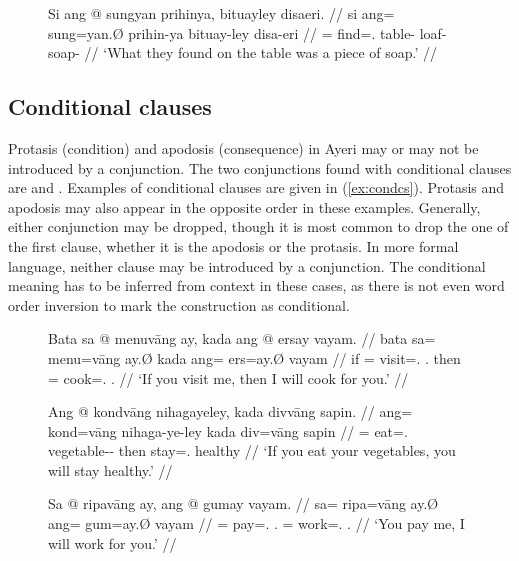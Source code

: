 \begin{figure}[h]
\ex\label{ex:relcheadless}%
\ljudge\ques\begingl
	\gla Si ang @ sungyan prihinya, bituayley disaeri. //
	\glb si ang= sung=yan.Ø prihin-ya bituay-ley disa-eri //
	\glc \Rel{} \AgtT{}= find=\TplM{}.\Top{} table-\Loc{} loaf-\PargI{}
		soap-\Ins{} //
	\glft `What they found on the table was a piece of soap.' //
\endgl
\xe
\end{figure}

\subsection{Conditional clauses}
\label{subsec:condcs}

Protasis (condition) and apodosis (consequence) in Ayeri may or may not be
introduced by a conjunction. The two conjunctions found with conditional
clauses are  and .
Examples of conditional clauses are given in (\ref{ex:condcs}). Protasis and
apodosis may also appear in the opposite order in these examples. Generally,
either conjunction may be dropped, though it is most common to drop the one of
the first clause, whether it is the apodosis or the protasis. In more formal
language, neither clause may be introduced by a conjunction. The conditional
meaning has to be inferred from context in these cases, as there is not even
word order inversion to mark the construction as conditional.

\begin{figure}
\pex\label{ex:condcs}
\a\label{ex:condcs_1}\begingl
	\gla Bata sa @ menuvāng ay, kada ang @ ersay vayam. //
	\glb bata sa= menu=vāng ay.Ø kada ang= ers=ay.Ø vayam //
	\glc if \PatT{}= visit=\Second.\Aarg{} \Fsg{}.\Top{} then \AgtT{}=
		cook=\Fsg{}.\Top{} \Second.\Dat{} //
	\glft `If you visit me, then I will cook for you.' //
\endgl

\a\label{ex:condcs_2}\begingl
	\gla Ang @ kondvāng nihagayeley, kada divvāng sapin. //
	\glb ang= kond=vāng nihaga-ye-ley kada div=vāng sapin //
	\glc \AgtT{}= eat=\Second.\Aarg{} vegetable-\Pl{}-\PargI{} then
		stay=\Second{}.\Aarg{} healthy //
	\glft `If you eat your vegetables, you will stay healthy.' //
\endgl

\a\label{ex:condcs_3}\begingl
	\gla Sa @ ripavāng ay, ang @ gumay vayam. //
	\glb sa= ripa=vāng ay.Ø ang= gum=ay.Ø vayam //
	\glc \PatT{}= pay=\Second{}.\Aarg{} \Fsg{}.\Top{} \Aarg{}=
		work=\Fsg{}.\Aarg{} \Second{}.\Dat{} //
	\glft `You pay me, I will work for you.' //
\endgl

\xe
\end{figure}

